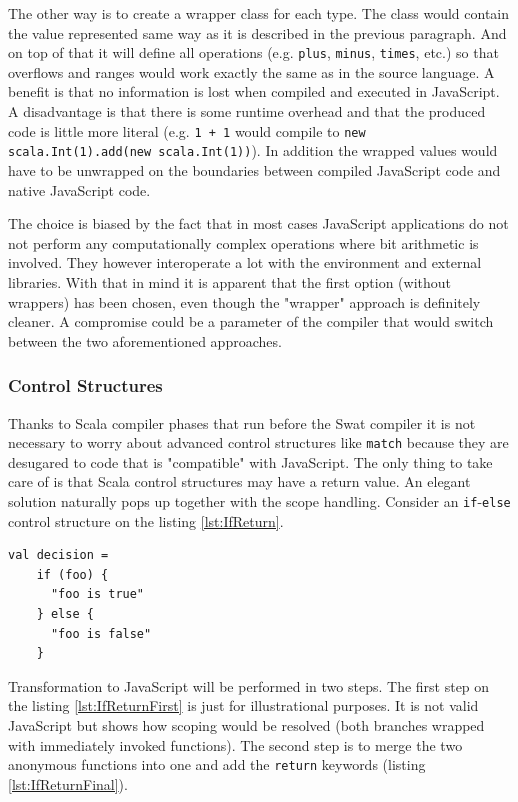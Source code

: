 \documentclass[12pt,a4paper]{report}
\begin{document}
The other way is to create a wrapper class for each type. The class would contain the value represented same way as it is described in the previous paragraph. And on top of that it will define all operations (e.g. \texttt{plus}, \texttt{minus}, \texttt{times}, etc.) so that overflows and ranges would work exactly the same as in the source language. A benefit is that no information is lost when compiled and executed in JavaScript. A disadvantage is that there is some runtime overhead and that the produced code is little more literal (e.g. \texttt{1 + 1} would compile to \texttt{new scala.Int(1).add(new scala.Int(1))}). In addition the wrapped values would have to be unwrapped on the boundaries between compiled JavaScript code and native JavaScript code. 

The choice is biased by the fact that in most cases JavaScript applications do not not perform any computationally complex operations where bit arithmetic is involved. They however interoperate a lot with the environment and external libraries. With that in mind it is apparent that the first option (without wrappers) has been chosen, even though the "wrapper" approach is definitely cleaner. A compromise could be a parameter of the compiler that would switch between the two aforementioned approaches.

\subsubsection*{Control Structures}

Thanks to Scala compiler phases that run before the Swat compiler it is not necessary to worry about advanced control structures like \texttt{match} because they are desugared to code that is "compatible" with JavaScript. The only thing to take care of is that Scala control structures may have a return value. An elegant solution naturally pops up together with the scope handling. Consider an \texttt{if}-\texttt{else} control structure on the listing \ref{lst:IfReturn}.

\begin{lstlisting}[caption={A condition with return value.},label={lst:IfReturn}]
val decision = 
	if (foo) {
	  "foo is true"
	} else {
	  "foo is false"
	}
\end{lstlisting}

Transformation to JavaScript will be performed in two steps. The first step on the listing \ref{lst:IfReturnFirst} is just for illustrational purposes. It is not valid JavaScript but shows how scoping would be resolved (both branches wrapped with immediately invoked functions). The second step is to merge the two anonymous functions into one and add the \texttt{return} keywords (listing \ref{lst:IfReturnFinal}).
\end{document}
